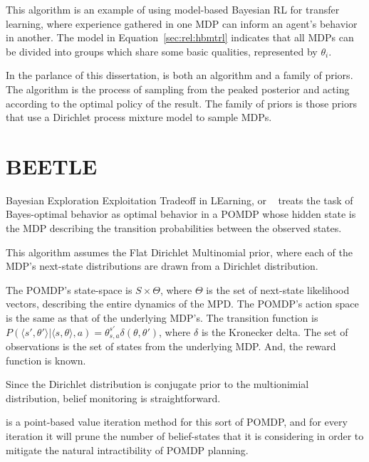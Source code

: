 This algorithm is an example of using model-based Bayesian RL for transfer learning, where experience gathered in one MDP can inform an agent's behavior in another. The model in Equation~\ref{sec:rel:hbmtrl} indicates that all MDPs can be divided into groups which share some basic qualities, represented by $\theta_i$.

In the parlance of this dissertation,  is both an algorithm and a family of priors. The algorithm is the process of sampling from the peaked posterior and acting according to the optimal policy of the result. The family of priors is those priors that use a Dirichlet process mixture model to sample MDPs.


\section{BEETLE}

Bayesian Exploration Exploitation Tradeoff in LEarning, or ~\cite{poupart06} treats the task of Bayes-optimal behavior as optimal behavior in a POMDP whose hidden state is the MDP describing the transition probabilities between the observed states.

This algorithm assumes the Flat Dirichlet Multinomial prior, where each of the MDP's next-state distributions are drawn from a Dirichlet distribution.

The POMDP's state-space is $S \times \Theta$, where $\Theta$ is the set of next-state likelihood vectors, describing the entire dynamics of the MPD. The POMDP's action space is the same as that of the underlying MDP's. The transition function is $P(\langle s', \theta' \rangle | \langle s,\theta\rangle, a) = \theta_{s,a}^{s'}\delta(\theta,\theta')$, where $\delta$ is the Kronecker delta. The set of observations is the set of states from the underlying MDP. And, the reward function is known.

Since the Dirichlet distribution is conjugate prior to the multionimial distribution, belief monitoring is straightforward.

  is a point-based value iteration method for this sort of POMDP, and for every iteration it will prune the number of belief-states that it is considering in order to mitigate the natural intractibility of POMDP planning.






